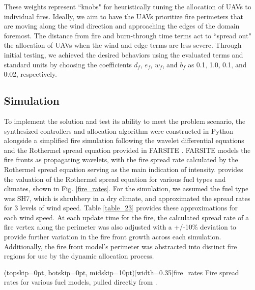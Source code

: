 \documentclass{ieeeaccess}
\begin{document}
These weights represent ``knobs" for heuristically tuning the allocation of UAVs to individual fires. Ideally, we aim to have the UAVs prioritize fire perimeters that are moving along the wind direction and approaching the edges of the domain foremost. The distance from fire and burn-through time terms act to ``spread out" the allocation of UAVs when the wind and edge terms are less severe. Through initial testing, we achieved the desired behaviors using the evaluated terms and standard units by choosing the coefficients $d_f$, $e_f$, $w_f$, and $b_f$ as 0.1, 1.0, 0.1, and 0.02, respectively.

\subsection{Simulation}

To implement the solution and test its ability to meet the problem scenario, the synthesized controllers and allocation algorithm were constructed in Python alongside a simplified fire simulation following the wavelet differential equations and the Rothermel spread equation provided in FARSITE \cite{FARSITE}. FARSITE models the fire fronts as propagating wavelets, with the fire spread rate calculated by the Rothermel spread equation serving as the main indication of intensity. \cite{rosthermel} provides the valuation of the Rothermel spread equation for various fuel types and climates, shown in Fig. \ref{fire_rates}. For the simulation, we assumed the fuel type was SH7, which is shrubbery in a dry climate, and approximated the spread rates for 3 levels of wind speed. Table \ref{table_23} provides these approximations for each wind speed. At each update time for the fire, the calculated spread rate of a fire vertex along the perimeter was also adjusted with a +/-10\% deviation to provide further variation in the fire front growth across each simulation. Additionally, the fire front model's perimeter was abstracted into distinct fire regions for use by the dynamic allocation process. 

\Figure[t!](topskip=0pt, botskip=0pt, midskip=10pt)[width=0.35\textwidth]{fire_rates}
{Fire spread rates for various fuel models, pulled directly from \cite{rosthermel}.\label{fire_rates}}
\end{document}

